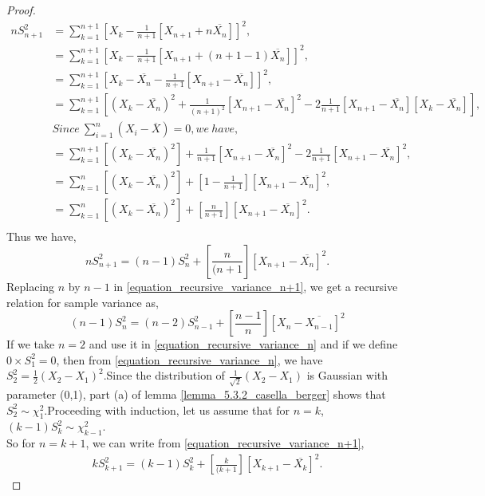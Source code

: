 \documentclass[a4paper,english,12pt]{article}
\begin{document}
\begin{proof}
\begin{align}
nS_{n+1} ^2& =\sum\limits_{k=1}^{n+1} [X_{k}-\frac{1}{n+1} [X_{n+1} + n\overline{X_n}]]^2 , \nonumber \\
& =\sum\limits_{k=1}^{n+1} [X_{k}-\frac{1}{n+1} [X_{n+1} + (n+1-1)\overline{X_n}]]^2 , \nonumber \\
& =\sum\limits_{k=1}^{n+1} [X_{k}-\overline{X_n}-\frac{1}{n+1}[X_{n+1} - \overline{X_n}]]^2 , \nonumber \\
& =\sum\limits_{k=1}^{n+1} [(X_{k}-\overline{X_n})^2+\frac{1}{(n+1)^2}[X_{n+1} - \overline{X_n}]^2-2 \frac{1}{n+1}[X_{n+1} - \overline{X_n}][X_{k}-\overline{X_n}]] , \nonumber \\
& Since~\sum_{i=1}^n(X_i-\overline{X})=0,we~have, \nonumber \\
& =\sum\limits_{k=1}^{n+1} [(X_{k}-\overline{X_n})^2]+\frac{1}{n+1}[X_{n+1} - \overline{X_n}]^2-2 \frac{1}{n+1}[X_{n+1} - \overline{X_n}]^2 , \nonumber \\
& =\sum\limits_{k=1}^{n} [(X_{k}-\overline{X_n})^2]+[1-\frac{1}{n+1}][X_{n+1} - \overline{X_n}]^2 , \nonumber \\
& =\sum\limits_{k=1}^{n} [(X_{k}-\overline{X_n})^2]+[\frac{n}{n+1}][X_{n+1} - \overline{X_n}]^2 . \nonumber \\
\end{align}
Thus we have,
\begin{equation} \label{equation_recursive_variance_n+1}
nS_{n+1} ^2=(n-1)S_{n} ^2+[\frac{n}{(n+1}][X_{n+1} - \overline{X_n}]^2.
\end{equation}
Replacing $n$ by $n-1$ in \eqref{equation_recursive_variance_n+1}, we get a recursive relation for sample variance as,
\begin{equation} \label{equation_recursive_variance_n}
(n-1)S_{n} ^2=(n-2)S_{n-1} ^2+[\frac{n-1}{n}][X_{n} - \overline{X_{n-1}}]^2
\end{equation} 
If we take $n=2$ and use it in \eqref{equation_recursive_variance_n} and if we define $0\times S_1 ^2=0$, then from \eqref{equation_recursive_variance_n}, we have $S_2^2=\frac{1}{2}(X_2-X_1)^2$.Since the distribution of $\frac{1}{\sqrt{2}}(X_2-X_1)$ is Gaussian with parameter (0,1), part (a) of lemma  \ref{lemma_5.3.2_casella_berger} shows that $S_2 ^2 \sim \chi_1 ^2$.Proceeding with induction, let us assume that for $n=k$, $(k-1)S_k ^2 \sim \chi_{k-1} ^2$.\\
So for $n=k+1$, we can write from \eqref{equation_recursive_variance_n+1},
\begin{align}
kS_{k+1} ^2=(k-1)S_{k} ^2+[\frac{k}{(k+1}][X_{k+1} - \overline{X_k}]^2.

\end{align}
\end{proof}
\end{document}
